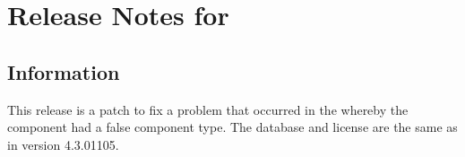 















\makeatletter
\section{Release Notes for \app{} \@bxversion}
\makeatother
\subsection{Information}
This release is a patch to fix a problem that occurred in the  whereby the  component had a false component type. The database and license are the same as in version 4.3.01105. 


